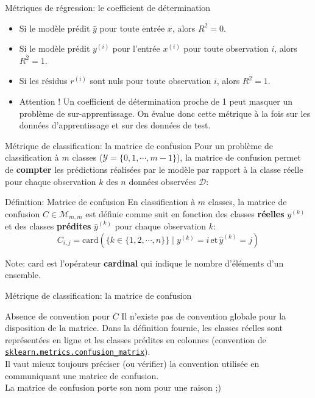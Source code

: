 \begin{frame}{Métriques de régression: le coefficient de détermination}
	\begin{itemize}
		\item Si le modèle prédit $\bar{y}$ pour toute entrée $x$, alors $R^2 = 0$.
		\pause
		\item Si le modèle prédit $y^{(i)}$ pour l'entrée $x^{(i)}$ pour toute observation $i$, alors $R^2 = 1$.
		\pause
		\item Si les résidus $r^{(i)}$ sont nuls pour toute observation $i$, alors $R^2 = 1$.
		\pause
		\item Attention ! Un coefficient de détermination proche de 1 peut masquer un problème de sur-apprentissage. On évalue donc cette métrique à la fois sur les données d'apprentissage et sur des données de test.
	\end{itemize}
\end{frame}

\begin{frame}{Métrique de classification: la matrice de confusion}
	Pour un problème de classification à $m$ classes ($\mathcal{Y} = \{0, 1, \cdots, m-1\}$), la matrice de confusion permet de \textbf{compter} les prédictions réalisées par le modèle par rapport à la classe réelle pour chaque observation $k$ des $n$ données observées $\mathcal{D}$:
	\begin{block}{Définition: Matrice de confusion}
		En classification à $m$ classes, la matrice de confusion $C \in \mathcal{M}_{m,m}$ est définie comme suit en fonction des classes \textbf{réelles} $y^{(k)}$ et des classes \textbf{prédites} $\hat{y}^{(k)}$ pour chaque observation $k$:
		\begin{equation}
			C_{i,j} = \text{card} \left( \{k \in \{1, 2, \cdots, n\}\} \mid y^{(k)} = i \, \text{et} \, \hat{y}^{(k)} = j \right)
			\nonumber
		\end{equation}
	\end{block}
	\pause
	Note: $\text{card}$ est l'opérateur \textbf{cardinal} qui indique le nombre d'éléments d'un ensemble.
\end{frame}

\begin{frame}{Métrique de classification: la matrice de confusion}
	\begin{alertblock}{Absence de convention pour $C$}
		Il n'existe pas de convention globale pour la disposition de la matrice. Dans la définition fournie, les classes réelles sont représentées en ligne et les classes prédites en colonnes (convention de \href{https://scikit-learn.org/stable/modules/generated/sklearn.metrics.confusion_matrix.html}{\texttt{sklearn.metrics.confusion\_matrix}}). \\
		\vspace{0.5cm}
		Il vaut mieux toujours préciser (ou vérifier) la convention utilisée en communiquant une matrice de confusion. \\
		\vspace{0.5cm}
		La matrice de confusion porte son nom pour une raison ;)
	\end{alertblock}
\end{frame}

